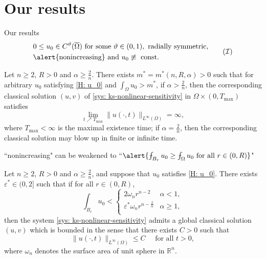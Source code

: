 \section{Our results}
\begin{frame}{Our results}
\begin{equation}\label{H: u_0}
	\begin{aligned}
	&0\leq u_0\in C^\vartheta(\overline{\Omega}) \text{ for some } \vartheta\in(0, 1),\text{ radially symmetric,}\\
	&\text{\alert{nonincreasing} and  } u_0\not\equiv \text{ const. } 
	\end{aligned}\tag{$\mathcal{I}$}
\end{equation}
\begin{theorem}\label{thm: large m implies blowup}
	Let $n\geqslant 2$, $R>0$ and $\alpha\geqslant\frac2n$. There exists $m^* = m^*(n, R, \alpha) > 0$ such that for arbitrary $u_0$ satisfying \eqref{H: u_0} and $\int_\Omega u_0 > m^*$, 
	if $\alpha > \frac2n$, then the corresponding classical solution $(u, v)$ of \eqref{sys: ks-nonlinear-sensitivity} in $\Omega\times(0, T_{\max})$ satisfies 	
    \begin{equation}\label{eq: blow up in finite time}
		\lim_{t\nearrow T_{\max}}\|u(\cdot, t)\|_{L^\infty(\Omega)} = \infty,
	\end{equation}	
	where $T_{\max} < \infty$ is the maximal existence time;
	if $\alpha=\frac2n$, then the corresponding classical solution may blow up in finite or infinite time.
\end{theorem}
``\alert{nonincreasing}" can be weakened to ``$\alert{\fint_{B_r}u_0\geq \fint_{\Omega}u_0 \text{ for all } r\in(0, R)}$"
\end{frame}

\begin{frame}

\begin{theorem}\label{thm: small m implies existence of globally bounded solution}
	Let $n\geqslant 2$, $R>0$ and $\alpha \geqslant\frac2n$, and suppose that $u_0$ satisfies \eqref{H: u_0}. 
	There exists $\varepsilon^*\in(0,2]$ such that if for all $r\in(0, R)$, 
	\begin{equation}\label{eq: small mass initial function with pointwise estimate}
	\int_{B_r}u_0 <
	\begin{cases}
	2\omega_n r^{n-2} & \alpha < 1,\\
	\varepsilon^*\omega_n r^{n-\frac2\alpha} & \alpha\geqslant1,\\
	\end{cases}
	\end{equation}
then the system \eqref{sys: ks-nonlinear-sensitivity} admits a global classical solution $(u, v)$ which is bounded in the sense that there exists $C>0$ such that
\begin{equation}\nonumber
	\|u(\cdot, t)\|_{L^\infty(\Omega)} \leqslant C \quad\text{ for all } t > 0,
\end{equation}
where $\omega_n$ denotes the surface area of unit sphere in $\mathbb{R}^n$.
\end{theorem}

\end{frame}

